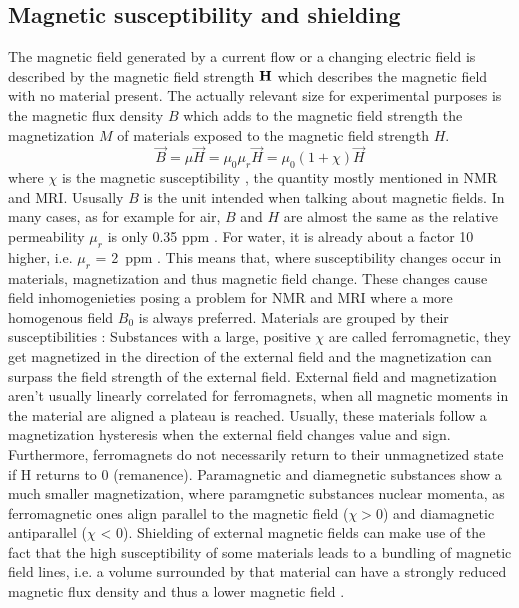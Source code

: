             \subsection{Magnetic susceptibility and shielding}
                The magnetic field generated by a current flow or a changing electric field is described by the magnetic field strength $\mathbf{H}$ which describes the magnetic field with no material present. The actually relevant size for experimental purposes is the magnetic flux density $B$ which adds to the magnetic field strength the magnetization $M$ of materials exposed to the magnetic field strength $H$.
                \begin{equation}
                    \vec{B} = \mu \vec{H} = \mu_0 \mu_r \vec{H} = \mu_0(1+\chi) \vec{H}
                \end{equation}
                where $\chi$ is the magnetic susceptibility \cite{schenck_role_1996}, the quantity mostly mentioned in NMR and MRI. Ususally $B$ is the unit intended when talking about magnetic fields.
                In many cases, as for example for air, $B$ and $H$ are almost the same as the relative permeability \cite{kriz_magnetic_1996} $\mu_r$ is only 0.35 ppm \cite{cullity_introduction_2008}. For water, it is already about a factor 10 higher, i.e. $\mu_r$ = 2~ppm . 
                This means that, where susceptibility changes occur in materials, magnetization and thus magnetic field change. These changes cause field inhomogenieties posing a problem for NMR and MRI where a more homogenous field $B_0$ is always preferred. Materials are grouped by their susceptibilities \cite{b.i._bleaney__b._bleaney_electricity_nodate}:
                Substances with a large, positive $\chi$ are called ferromagnetic, they get magnetized in the direction of the external field and the magnetization can surpass the field strength of the external field. External field and magnetization aren't usually linearly correlated for ferromagnets, when all magnetic moments in the material are aligned a plateau is reached. Usually, these materials follow a magnetization hysteresis when the external field changes value and sign. Furthermore, ferromagnets do not necessarily return to their unmagnetized state if H returns to 0 (remanence).
                Paramagnetic and diamegnetic substances show a much smaller magnetization, where paramgnetic substances nuclear momenta, as ferromagnetic ones align parallel to the magnetic field ($\chi>0$) and diamagnetic antiparallel ($\chi$ < 0).
                Shielding of external magnetic fields can make use of the fact that the high susceptibility of some materials leads to a bundling of magnetic field lines, i.e. a volume surrounded by that material can have a strongly reduced magnetic flux density and thus a lower magnetic field \cite{mager_magnetic_1970}.
